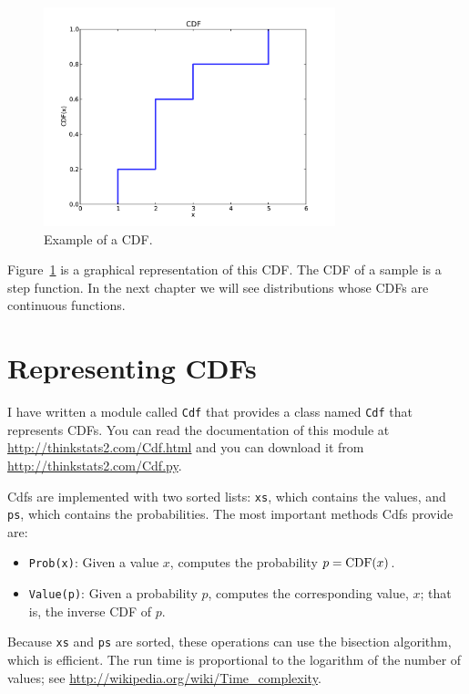 \documentclass[12pt]{book}
\begin{document}
\begin{figure}
\centerline{\includegraphics[height=2.5in]{figs/example_cdf.pdf}}
\caption{Example of a CDF.}
\label{example_cdf}
\end{figure}

Figure~\ref{example_cdf} is a graphical representation of this CDF.
The CDF of a sample is a step function.  In the next chapter we
will see distributions whose CDFs are continuous functions.  


\section{Representing CDFs}

I have written a module called {\tt Cdf} that provides a class named
{\tt Cdf} that represents CDFs.  You can read the documentation of
this module at \url{http://thinkstats2.com/Cdf.html} and you can download it
from \url{http://thinkstats2.com/Cdf.py}.

Cdfs are implemented with two sorted lists: {\tt xs}, which contains
the values, and {\tt ps}, which contains the probabilities.  The
most important methods Cdfs provide are:

\begin{itemize}

\item {\tt Prob(x)}: Given a value $x$, computes the probability $p = \mathrm{CDF}(x)$.

\item {\tt Value(p)}: Given a probability $p$, computes the
corresponding value, $x$; that is, the inverse CDF of $p$.

\end{itemize}

Because {\tt xs} and {\tt ps} are sorted, these operations can use the
bisection algorithm, which is efficient.  The run time is proportional
to the logarithm of the number of values; see
\url{http://wikipedia.org/wiki/Time_complexity}.
\end{document}
